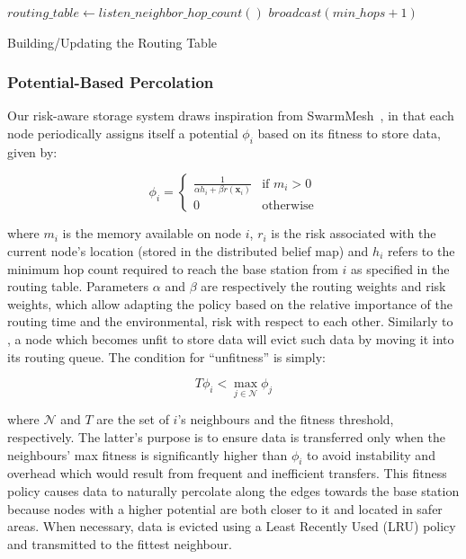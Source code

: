 \documentclass[letterpaper, 10 pt, conference]{ieeeconf}
\begin{document}
\begin{algorithm}[h]
\small
\SetAlgoLined
\DontPrintSemicolon
    $routing\_table \longleftarrow listen\_neighbor\_hop\_count()$\;
    \;
    \;
    $broadcast(min\_hops + 1)$\;
\caption{Building/Updating the Routing Table}
\label{alg:routing}
\end{algorithm}

\subsubsection{Potential-Based Percolation}
Our risk-aware storage system draws inspiration from 
SwarmMesh~\cite{majcherczykSwarmmesh2020}, in that each node periodically assigns
itself a potential $\phi_i$ based on its fitness to store data, given by:

\begin{equation}
        \phi_i =
        \left\{ 
        \begin{array}{ll}
            \frac{1}{\alpha h_i + \beta r({\bm{x}_i})} &\text{if } m_i > 0 \\
            0 &\text{otherwise}
        \end{array} \right.
        \label{equation:fitness}
\end{equation}

 where $m_i$ is the memory available on node $i$, $r_i$ is the risk
 associated with the current node's location (stored in the
 distributed belief map) and $h_i$ refers to the minimum hop count
 required to reach the base station from $i$ as specified in the
 routing table. Parameters $\alpha$ and $\beta$ are respectively the routing weights and 
 risk weights, which allow adapting the policy based on the relative importance of the 
 routing time and the environmental, risk with respect to each other. Similarly to 
 \cite{majcherczykSwarmmesh2020}, a node  which becomes unfit to store data will evict such 
 data by moving it into its routing queue. The condition for ``unfitness'' is simply:

\begin{equation}
    T\phi_i < \max_{j \in \mathcal{N}} \phi_j
\end{equation}

where $\mathcal{N}$ and $T$ are the set of $i$'s neighbours and the fitness threshold, 
respectively. The latter's purpose is to ensure data is transferred only when the 
neighbours' max fitness is significantly higher than $\phi_i$ to avoid instability and 
overhead which would result from frequent and inefficient transfers. This fitness policy  causes data to naturally percolate along the edges towards the base station because nodes 
with a higher potential are both closer to it and
located in safer areas. When necessary, data is evicted using a Least Recently Used (LRU) policy and transmitted to the fittest neighbour.
\end{document}
